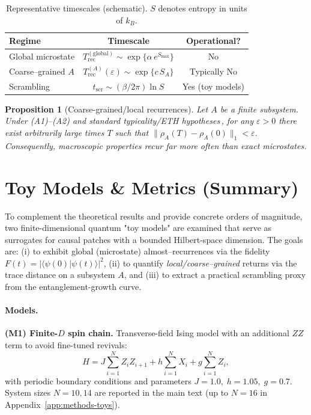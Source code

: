 \documentclass[12pt]{article}
\newcommand{\Smax}{S_{\max}}
\newcommand{\TrecA}{T^{(A)}_{\text{rec}}}
\newcommand{\tscr}{t_{\text{scr}}}
\newtheorem{proposition}{Proposition}
\theoremstyle{remark}
\begin{document}
\begin{table}[t]
\centering
\caption{Representative timescales (schematic). $S$ denotes entropy in units of $k_B$.}
\begin{tabular}{lcc}
\toprule
Regime & Timescale & Operational? \\
\midrule
Global microstate & $\displaystyle T^{\mathrm{(global)}}_{\text{rec}}\sim \exp\{\alpha\,e^{\Smax}\}$ & No \\
Coarse–grained $A$ & $\displaystyle \TrecA(\varepsilon)\sim \exp\{c\,S_A\}$ & Typically No \\
Scrambling & $\displaystyle \tscr\sim (\beta/2\pi)\ln S$ & Yes (toy models) \\
\bottomrule
\end{tabular}
\label{tab:times}
\end{table}


\begin{proposition}[Coarse-grained/local recurrences]\label{prop:coarse}
Let $A$ be a finite subsystem. Under (A1)--(A2) and standard typicality/ETH hypotheses\,\cite{GoldsteinEtAl2006,Deutsch1991}, for any $\varepsilon>0$ there exist arbitrarily large times $T$ such that $\lVert\rho_A(T)-\rho_A(0)\rVert_1<\varepsilon$. Consequently, macroscopic properties recur far more often than exact microstates.
\end{proposition}


\section{Toy Models \& Metrics (Summary)}
\label{sec:toymodels}

To complement the theoretical results and provide concrete orders of magnitude, two finite-dimensional quantum "toy models" are examined that serve as surrogates for causal patches with a bounded Hilbert-space dimension. The goals are: (i) to exhibit global (microstate) almost–recurrences via the fidelity
\(
F(t)=|\langle\psi(0)|\psi(t)\rangle|^2
\),
(ii) to quantify \emph{local/coarse–grained} returns via the trace distance on a subsystem \(A\),
and (iii) to extract a practical scrambling proxy from the entanglement-growth curve.

\paragraph{Models.}
\textbf{(M1) Finite-$D$ spin chain.}
Transverse-field Ising model with an additional \(ZZ\) term to avoid fine-tuned revivals:
\[
H = J\sum_{i=1}^{N} Z_i Z_{i+1} + h\sum_{i=1}^{N} X_i + g\sum_{i=1}^{N} Z_i,
\]
with periodic boundary conditions and parameters \(J=1.0,\; h=1.05,\; g=0.7\).
System sizes \(N=10,14\) are reported in the main text (up to \(N=16\) in Appendix~\ref{app:methods-toys}).
\end{document}
